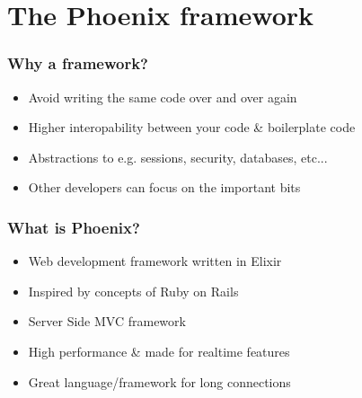 \section{The Phoenix framework}

\frame{\tableofcontents[currentsection]}

\begin{frame}
    \frametitle{Why a framework?}
    \begin{itemize}
        \item Avoid writing the same code over and over again
        \item Higher interopability between your code \& boilerplate code
        \item Abstractions to e.g. sessions, security, databases, etc...
        \item Other developers can focus on the important bits
    \end{itemize}
\end{frame}

\begin{frame}
    \frametitle{What is Phoenix?}
    \begin{itemize}
        \item Web development framework written in Elixir
        \item Inspired by concepts of Ruby on Rails
        \item Server Side MVC framework
        \item High performance \& made for realtime features
        \item Great language/framework for long connections
    \end{itemize}
\end{frame}